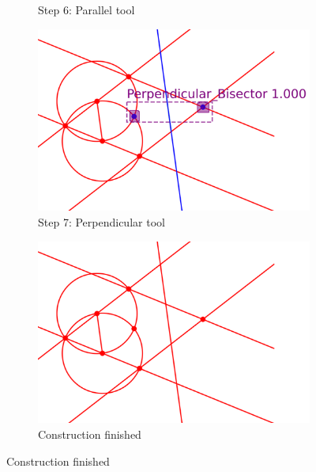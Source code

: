 \begin{figure}[!h]
\begin{subfigure}[t]{0.32\textwidth}
         \caption{Step 6: Parallel tool}
         \label{fig:Epsilon12_example_step6}
     \end{subfigure}
     \hfill
     \begin{subfigure}[t]{0.32\textwidth}
         \centering
         \includegraphics[width=\textwidth]{img/Epsilon-12_example/output_image6.png}
         \caption{Step 7: Perpendicular tool}
         \label{fig:Epsilon12_example_step7}
     \end{subfigure}
     \hfill
     \begin{subfigure}[t]{0.32\textwidth}
         \centering
         \includegraphics[width=\textwidth]{img/Epsilon-12_example/input_image7.png}
         \caption{Construction finished}
         \label{fig:Epsilon12_example_fin}
     \end{subfigure}
     \hfill
     

\end{figure}
